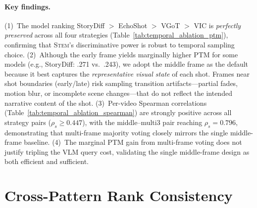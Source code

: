 \documentclass[sigconf,review,anonymous]{acmart}
\newcommand{\stem}{\textsc{Stem}}
\begin{document}
\paragraph{Key findings.}
(1)~The model ranking StoryDiff $>$ EchoShot $>$ VGoT $>$ VIC is \emph{perfectly preserved} across all four strategies (Table~\ref{tab:temporal_ablation_ptm}), confirming that \stem{}'s discriminative power is robust to temporal sampling choice.
(2)~Although the early frame yields marginally higher PTM for some models (e.g., StoryDiff: .271 vs.\ .243), we adopt the middle frame as the default because it best captures the \emph{representative visual state} of each shot. Frames near shot boundaries (early/late) risk sampling transition artifacts---partial fades, motion blur, or incomplete scene changes---that do not reflect the intended narrative content of the shot.
(3)~Per-video Spearman correlations (Table~\ref{tab:temporal_ablation_spearman}) are strongly positive across all strategy pairs ($\rho_s \geq 0.447$), with the middle--multi3 pair reaching $\rho_s = 0.796$, demonstrating that multi-frame majority voting closely mirrors the single middle-frame baseline.
(4)~The marginal PTM gain from multi-frame voting does not justify tripling the VLM query cost, validating the single middle-frame design as both efficient and sufficient.



\section{Cross-Pattern Rank Consistency}
\label{app:rank_consistency}
\end{document}
